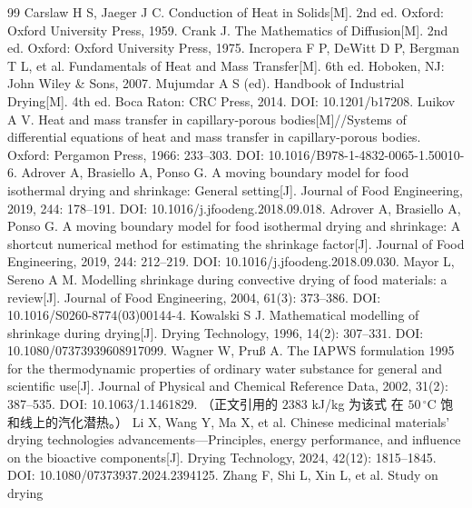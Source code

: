 \begin{thebibliography}{99}
\small
{} Carslaw H S, Jaeger J C. Conduction of Heat in Solids[M].
  2nd ed. Oxford: Oxford University Press, 1959.
 Crank J. The Mathematics of Diffusion[M]. 2nd ed.
  Oxford: Oxford University Press, 1975.
 Incropera F P, DeWitt D P, Bergman T L, et al.
    Fundamentals of Heat and Mass Transfer[M]. 6th ed. Hoboken, NJ:
  John Wiley \& Sons, 2007.
 Mujumdar A S (ed). Handbook of Industrial Drying[M].
  4th ed. Boca Raton: CRC Press, 2014. DOI: 10.1201/b17208.
 Luikov A V. Heat and mass transfer in capillary-porous
  bodies[M]//Systems of differential equations of heat and mass transfer in
  capillary-porous bodies. Oxford: Pergamon Press, 1966: 233--303.
  DOI: 10.1016/B978-1-4832-0065-1.50010-6.
 Adrover A, Brasiello A, Ponso G. A moving boundary model
  for food isothermal drying and shrinkage: General setting[J]. Journal of Food
  Engineering, 2019, 244: 178--191. DOI: 10.1016/j.jfoodeng.2018.09.018.
 Adrover A, Brasiello A, Ponso G. A moving boundary model
  for food isothermal drying and shrinkage: A shortcut numerical method for
  estimating the shrinkage factor[J]. Journal of Food Engineering, 2019,
  244: 212--219. DOI: 10.1016/j.jfoodeng.2018.09.030.
 Mayor L, Sereno A M. Modelling shrinkage during convective
  drying of food materials: a review[J]. Journal of Food Engineering, 2004,
  61(3): 373--386. DOI: 10.1016/S0260-8774(03)00144-4.
 Kowalski S J. Mathematical modelling of shrinkage during
  drying[J]. Drying Technology, 1996, 14(2): 307--331.
  DOI: 10.1080/07373939608917099.
 Wagner W, Pru\ss{} A. The IAPWS formulation 1995 for the
  thermodynamic properties of ordinary water substance for general and
  scientific use[J]. Journal of Physical and Chemical Reference Data, 2002,
    31(2): 387--535. DOI: 10.1063/1.1461829. （正文引用的 $2383$ kJ/kg 为该式
  在 $50\,^\circ$C 饱和线上的汽化潜热。）
 Li X, Wang Y, Ma X, et al. Chinese medicinal materials' drying
  technologies advancements---Principles, energy performance, and influence on
  the bioactive components[J]. Drying Technology, 2024, 42(12): 1815--1845.
  DOI: 10.1080/07373937.2024.2394125.
 Zhang F, Shi L, Xin L, et al. Study on drying

\end{thebibliography}
